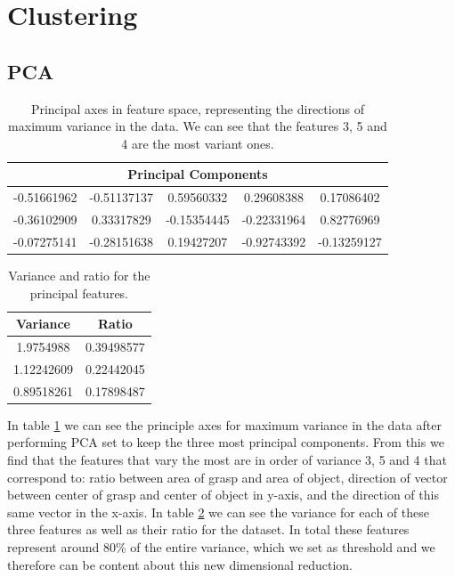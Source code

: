 %

\section{Clustering}

\subsection{PCA}

\begin{table}
	\begin{tabular}{ c c c c c }
		\hline
		\multicolumn{5}{c}{Principal Components} \\ \hline
		-0.51661962 & -0.51137137 &  0.59560332 &  0.29608388 &  0.17086402 \\ \hline
		-0.36102909 &  0.33317829 & -0.15354445 & -0.22331964 &  0.82776969 \\ \hline
		-0.07275141 & -0.28151638 &  0.19427207 & -0.92743392 & -0.13259127 \\ \hline
	\end{tabular}
	\caption{Principal axes in feature space, representing the directions of maximum variance in the data. We can see that the features 3, 5 and 4 are the most variant ones.}
	\label{tab:pca_components}
\end{table}

\begin{table}
	\begin{center}
		\begin{tabular}{cc}
			\hline
			Variance & Ratio \\ \hline
			1.9754988 & 0.39498577 \\
			1.12242609 & 0.22442045 \\
			0.89518261 & 0.17898487 \\
			\hline
		\end{tabular}
		\caption{Variance and ratio for the principal features.}
		\label{tab:pca_variance}
	\end{center}
\end{table}

In table \ref{tab:pca_components} we can see the principle axes for maximum variance in the data after performing PCA set to keep the three most principal components. From this we find that the features that vary the most are in order of variance 3, 5 and 4 that correspond to: ratio between area of grasp and area of object, direction of vector between center of grasp and center of object in y-axis, and the direction of this same vector in the x-axis. In table \ref{tab:pca_variance} we can see the variance for each of these three features as well as their ratio for the dataset. In total these features represent around 80\% of the entire variance, which we set as threshold and we therefore can be content about this new dimensional reduction.

